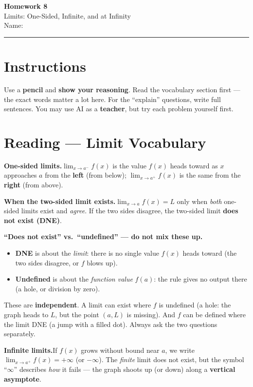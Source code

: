\documentclass[12pt]{article}
\begin{document}
\pagestyle{fancy}
\begin{center}
  {\Large\bfseries Homework 8}\\[4pt]
  Limits: One-Sided, Infinite, and at Infinity\\[6pt]
  Name:\;\underline{\hspace{6.5cm}}\quad
\end{center}
\hrule\bigskip

\section*{Instructions}
Use a \textbf{pencil} and \textbf{show your reasoning}. Read the vocabulary section first --- the exact words matter a
lot here. For the ``explain'' questions, write full sentences. You may use AI as a \textbf{teacher}, but try each
problem yourself first.

\section*{Reading --- Limit Vocabulary}
\textbf{One-sided limits.}\quad $\displaystyle\lim_{x \to a^-} f(x)$ is the value $f(x)$ heads toward as $x$
approaches $a$ from the \textbf{left} (from below); $\displaystyle\lim_{x \to a^+} f(x)$ is the same from the
\textbf{right} (from above).

\textbf{When the two-sided limit exists.}\quad $\displaystyle\lim_{x \to a} f(x) = L$ only when \emph{both}
one-sided limits exist and \emph{agree}. If the two sides disagree, the two-sided limit \textbf{does not exist
(DNE)}.

\textbf{``Does not exist'' vs.\ ``undefined'' --- do not mix these up.}
\begin{itemize}
  \item \textbf{DNE} is about the \emph{limit}: there is no single value $f(x)$ heads toward (the two sides
        disagree, or $f$ blows up).
  \item \textbf{Undefined} is about the \emph{function value} $f(a)$: the rule gives no output there (a hole, or
        division by zero).
\end{itemize}
These are \textbf{independent}. A limit can exist where $f$ is undefined (a hole: the graph heads to $L$, but the
point $(a,L)$ is missing). And $f$ can be defined where the limit DNE (a jump with a filled dot). Always ask the
two questions separately.

\textbf{Infinite limits.}\quad If $f(x)$ grows without bound near $a$, we write
$\displaystyle\lim_{x \to a^+} f(x) = +\infty$ (or $-\infty$). The \emph{finite} limit does not exist, but the
symbol ``$\infty$'' describes \emph{how} it fails --- the graph shoots up (or down) along a \textbf{vertical
asymptote}.
\end{document}
